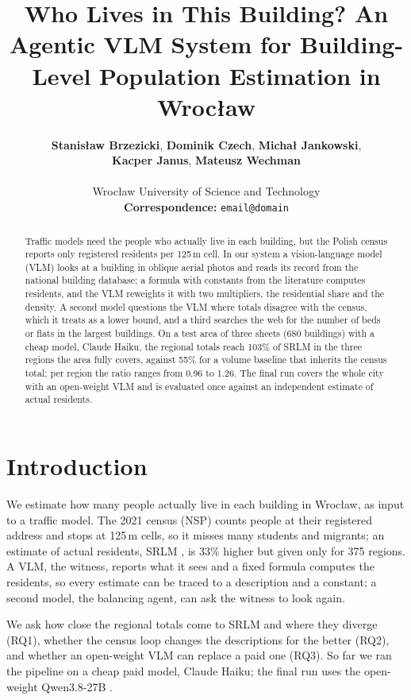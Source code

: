 \documentclass[11pt]{article}
\title{Who Lives in This Building? An Agentic VLM System for Building-Level Population Estimation in Wrocław}
\author{
  \textbf{Stanisław Brzezicki},
  \textbf{Dominik Czech},
  \textbf{Michał Jankowski},
\\
  \textbf{Kacper Janus},
  \textbf{Mateusz Wechman}
\\
\\
  Wrocław University of Science and Technology
\\
  \small{
    \textbf{Correspondence:} \texttt{email@domain}
  }
}
\begin{document}
\maketitle

\begin{abstract}
Traffic models need the people who actually live in each building, but the Polish census reports only registered residents per 125\,m cell.
In our system a vision-language model (VLM) looks at a building in oblique aerial photos and reads its record from the national building database; a formula with constants from the literature computes residents, and the VLM reweights it with two multipliers, the residential share and the density.
A second model questions the VLM where totals disagree with the census, which it treats as a lower bound, and a third searches the web for the number of beds or flats in the largest buildings.
On a test area of three sheets (680 buildings) with a cheap model, Claude Haiku, the regional totals reach 103\% of SRLM in the three regions the area fully covers, against 55\% for a volume baseline that inherits the census total; per region the ratio ranges from 0.96 to 1.26.
The final run covers the whole city with an open-weight VLM and is evaluated once against an independent estimate of actual residents.
\end{abstract}

\section{Introduction}

We estimate how many people actually live in each building in Wrocław, as input to a traffic model.
The 2021 census (NSP) counts people at their registered address and stops at 125\,m cells, so it misses many students and migrants; an estimate of actual residents, SRLM \citep{szmytkie2023srlm}, is 33\% higher but given only for 375 regions.
A VLM, the witness, reports what it sees and a fixed formula computes the residents, so every estimate can be traced to a description and a constant; a second model, the balancing agent, can ask the witness to look again.

We ask how close the regional totals come to SRLM and where they diverge (RQ1), whether the census loop changes the descriptions for the better (RQ2), and whether an open-weight VLM can replace a paid one (RQ3).
So far we ran the pipeline on a cheap paid model, Claude Haiku; the final run uses the open-weight Qwen3.8-27B \citep{qwen2026}.
\end{document}
